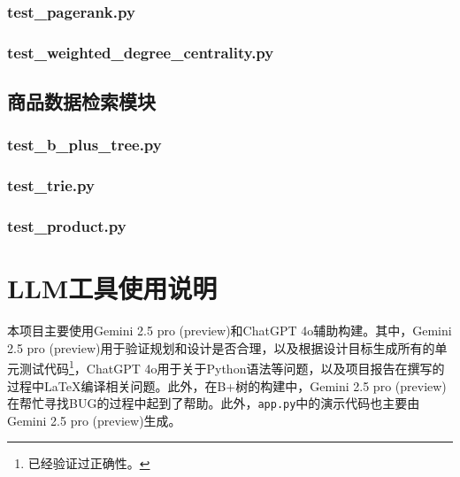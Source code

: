 \documentclass[cn,hazy,blue,10pt,normal]{elegantnote}
\begin{document}
\subsubsection{test\_pagerank.py}


\subsubsection{test\_weighted\_degree\_centrality.py}


\subsection{商品数据检索模块}
\subsubsection{test\_b\_plus\_tree.py}


\subsubsection{test\_trie.py}


\subsubsection{test\_product.py}


\section{LLM工具使用说明}
\label{sec: llm}
本项目主要使用Gemini 2.5 pro (preview)和ChatGPT 4o辅助构建。其中，Gemini 2.5 pro (preview)用于验证规划和设计是否合理，以及根据设计目标生成所有的单元测试代码\footnote{已经验证过正确性。}，ChatGPT 4o用于关于Python语法等问题，以及项目报告在撰写的过程中\LaTeX 编译相关问题。此外，在B+树的构建中，Gemini 2.5 pro (preview)在帮忙寻找BUG的过程中起到了帮助。此外，\texttt{app.py}中的演示代码也主要由Gemini 2.5 pro (preview)生成。
\end{document}
